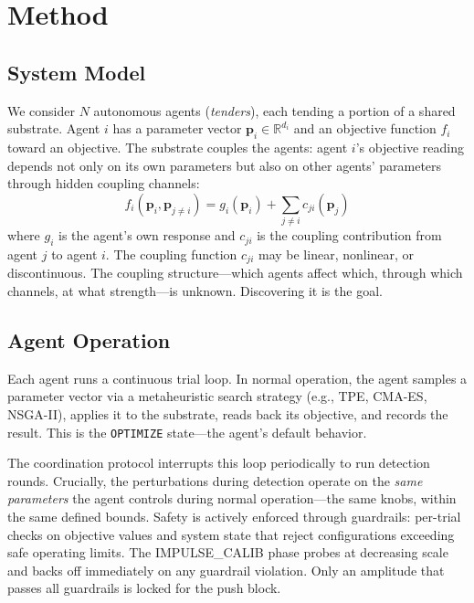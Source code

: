 \section{Method}
\label{sec:method}

\subsection{System Model}

We consider $N$ autonomous agents (\emph{tenders}), each tending a
portion of a shared substrate. Agent $i$ has a parameter vector
$\mathbf{p}_i \in \mathbb{R}^{d_i}$ and an objective function $f_i$
toward an objective. The substrate couples the agents: agent
$i$'s objective reading depends not only on its own parameters but
also on other agents' parameters through hidden coupling channels:
\begin{equation}
  f_i(\mathbf{p}_i, \mathbf{p}_{j \neq i}) = g_i(\mathbf{p}_i) +
    \sum_{j \neq i} c_{ji}(\mathbf{p}_j)
\end{equation}
where $g_i$ is the agent's own response and $c_{ji}$ is the coupling
contribution from agent $j$ to agent $i$. The coupling function
$c_{ji}$ may be linear, nonlinear, or discontinuous. The coupling
structure---which agents affect which, through which channels, at
what strength---is unknown. Discovering it is the goal.

\subsection{Agent Operation}

Each agent runs a continuous trial loop. In normal operation, the
agent samples a parameter vector via a metaheuristic search
strategy (e.g., TPE, CMA-ES, NSGA-II), applies it to the substrate, reads back
its objective, and records the result. This is the \texttt{OPTIMIZE}
state---the agent's default behavior.

The coordination protocol interrupts this loop periodically to run
detection rounds. Crucially, the perturbations during detection
operate on the \emph{same parameters} the agent controls during
normal operation---the same knobs, within the same defined bounds.
Safety is actively enforced through guardrails: per-trial checks on
objective values and system state that reject configurations
exceeding safe operating limits. The IMPULSE\_CALIB phase probes at
decreasing scale and backs off immediately on any guardrail
violation. Only an amplitude that passes all guardrails is locked
for the push block.

